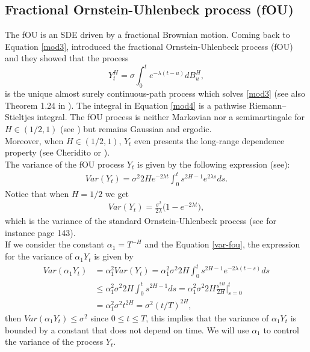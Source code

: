 \documentclass[smallextended]{svjour3}
\begin{document}
\subsection{Fractional Ornstein-Uhlenbeck process (fOU)}\label{sect-OU}


The fOU is an SDE driven by a fractional Brownian motion. 
Coming back to Equation \eqref{mod3}, \cite{ch-ka-ma}
introduced the fractional Ornstein-Uhlenbeck process (fOU) and they 
showed that the process
\begin{equation}
	Y_t ^ H = \sigma \int_0 ^ t e ^ {-\lambda(t - u)} dB_u^H, \label{mod4}
\end{equation}
is the unique almost surely continuous-path process which solves \eqref{mod3}
(see also Theorem 1.24 in \cite{ra}).
The integral in Equation \eqref{mod4} is a
pathwise Riemann–Stieltjes integral.  The fOU process is neither Markovian nor
a semimartingale for $H \in(1/2,1)$ (see \cite{du-no}) but remains
Gaussian and ergodic.\\

Moreover, when $H \in(1/2,1)$, $Y_t$ even presents the long-range dependence
property (see Cheridito
\cite{ch-ka-ma} or  \cite{ra}).\\

The variance of the fOU process $Y_t$ is given by the following expression
(see\cite{ze-ch-ya}):
\begin{align}
Var(Y_t)= \sigma^2 2H e^{-2\lambda t} \int_0^t s^{2H-1} e^{2\lambda s}
ds.\label{var-fou}
\end{align}
Notice that when $H=1/2$ we get
\begin{align}
Var(Y_t)= \frac{\sigma^2}{2\lambda}  \big(1-e^{-2\lambda t}\big),
\end{align}
which is the variance of the standard Ornstein-Uhlenbeck process (see for
instance \cite{mik} page 143). \\

If we consider the constant $\alpha_1 = T^{-H}$ and the Equation
\eqref{var-fou},
the expression for the variance of $\alpha_1 Y_t$ is given by
\begin{align}
Var(\alpha_1 Y_t)&= \alpha_1^2 Var(Y_t)= \alpha_1^2\sigma^2 2H  \int_0^t
s^{2H-1} e^{-2\lambda (t-s)} ds\nonumber
\\
&\le \alpha_1^2 \sigma^2 2H  \int_0^t s^{2H-1} ds= \alpha_1^2 \sigma^2 2H
\frac{s^{2H}}{2H}\Big|_{s=0}^t \nonumber
\\
&= \alpha_1^2 \sigma^2 t^{2H} = \sigma^2 (t/T)^{2H},\label{var-fou1}
\end{align}
then $Var(\alpha_1 Y_t)\le \sigma^2 $ since $0\le t\le T$, this implies that
the variance of $\alpha_1 Y_t$
is bounded by a constant that does not depend on time. We will use $\alpha_1$
to control the variance of the process $Y_t$.
\end{document}
